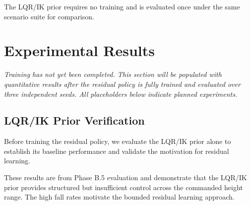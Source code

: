 \documentclass[conference]{IEEEtran}
\begin{document}
The LQR/IK prior requires no training and is evaluated once under the
same scenario suite for comparison.

\section{Experimental Results}
\label{sec:results}

\textit{Training has not yet been completed.
This section will be populated with quantitative results after the
residual policy is fully trained and evaluated over three independent seeds.
All placeholders below indicate planned experiments.}

\subsection{LQR/IK Prior Verification}
\label{sec:prior_verification}

Before training the residual policy, we evaluate the LQR/IK prior alone
to establish its baseline performance and validate the motivation for
residual learning.

\begin{table}[ht]
\centering
\caption{LQR/IK prior performance at fixed commanded heights.
Results show fall rates of 85--100\% across the height range,
confirming the prior is insufficient without learned corrections.}
\label{tab:prior_verification}
\end{table}

These results are from Phase B.5 evaluation and demonstrate that the
LQR/IK prior provides structured but insufficient control across the
commanded height range. The high fall rates motivate the bounded
residual learning approach.
\end{document}
